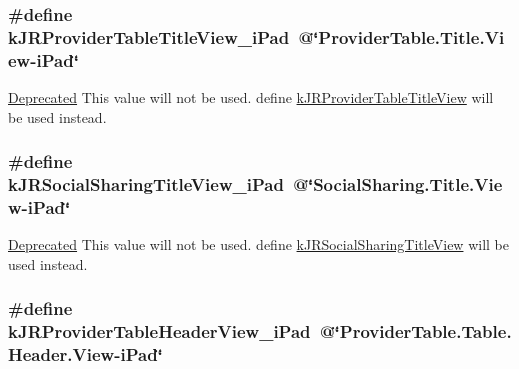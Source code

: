 \hypertarget{group__custom_interface_ga52c322e9fd2aa78cbd64d050f0fd5e41}{
\subsubsection[{kJRProviderTableTitleView\_\-iPad}]{\setlength{\rightskip}{0pt plus 5cm}\#define kJRProviderTableTitleView\_\-iPad~@\char`\"{}ProviderTable.Title.View-\/iPad\char`\"{}}}
\label{group__custom_interface_ga52c322e9fd2aa78cbd64d050f0fd5e41}
\begin{Desc}
\item[\hyperlink{deprecated__deprecated000012}{Deprecated}]This value will not be used. define \hyperlink{group__custom_interface_ga0bce97edf43c9cdf53cbcd1aa92c4798}{kJRProviderTableTitleView} will be used instead. \end{Desc}
\hypertarget{group__custom_interface_ga2f88062cdd1fd38ad0e800d382450398}{
\subsubsection[{kJRSocialSharingTitleView\_\-iPad}]{\setlength{\rightskip}{0pt plus 5cm}\#define kJRSocialSharingTitleView\_\-iPad~@\char`\"{}SocialSharing.Title.View-\/iPad\char`\"{}}}
\label{group__custom_interface_ga2f88062cdd1fd38ad0e800d382450398}
\begin{Desc}
\item[\hyperlink{deprecated__deprecated000013}{Deprecated}]This value will not be used. define \hyperlink{group__custom_interface_ga524965cf426f0eb9de4bcb804528c7f7}{kJRSocialSharingTitleView} will be used instead. \end{Desc}
\hypertarget{group__custom_interface_gafaf90a1aa537b105ebc2409ceacc652f}{
\subsubsection[{kJRProviderTableHeaderView\_\-iPad}]{\setlength{\rightskip}{0pt plus 5cm}\#define kJRProviderTableHeaderView\_\-iPad~@\char`\"{}ProviderTable.Table.Header.View-\/iPad\char`\"{}}}
